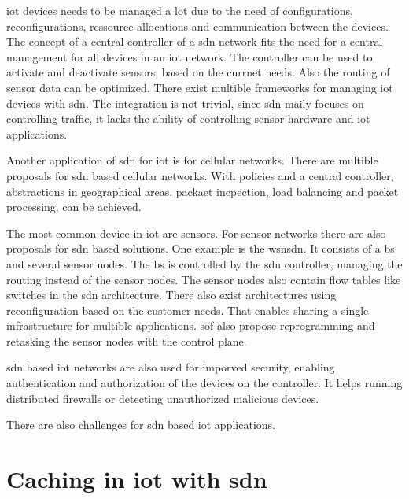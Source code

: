 \documentclass[conference]{IEEEtran}
\begin{document}
	\ac{iot} devices needs to be managed a lot due to the need of configurations, reconfigurations, ressource allocations and communication between the devices. \cite{10.1145/3102304.3102319} The concept of a central controller of a \ac{sdn} network fits the need for a central management for all devices in an \ac{iot} network. The controller can be used to activate and deactivate sensors, based on the currnet needs. Also the routing of sensor data can be optimized. \cite{Li2020-lx} There exist multible frameworks for managing \ac{iot} devices with \ac{sdn}. \cite{10.1145/3102304.3102319} The integration is not trivial, since \ac{sdn} maily focuses on controlling traffic, it lacks the ability of controlling sensor hardware and \ac{iot} applications. \cite{Li2020-lx}

	Another application of \ac{sdn} for \ac{iot} is for cellular networks. There are multible proposals for \ac{sdn} based cellular networks. With policies and a central controller, abstractions in geographical areas, packaet incpection, load balancing and packet processing, can be achieved. \cite{10.1145/3102304.3102319}

	The most common device in \ac{iot} are sensors. For sensor networks there are also proposals for \ac{sdn} based solutions. One example is the \ac{wsnsdn}. It consists of a \ac{bs} and several sensor nodes. The \ac{bs} is controlled by the \ac{sdn} controller, managing the routing instead of the sensor nodes. The sensor nodes also contain flow tables like switches in the \ac{sdn} architecture. \cite{Li2020-lx} There also exist architectures using reconfiguration based on the customer needs. That enables sharing a single infrastructure for multible applications. \ac{sof} also propose reprogramming and retasking the sensor nodes with the control plane. \cite{10.1145/3102304.3102319}

	\ac{sdn} based \ac{iot} networks are also used for imporved security, enabling authentication and authorization of the devices on the controller. It helps running distributed firewalls or detecting unauthorized malicious devices. \cite{10.1145/3102304.3102319}

	There are also challenges for \ac{sdn} based \ac{iot} applications.

	\cite{8777339} \cite{10.1145/3102304.3102319}

	\section{Caching in \ac{iot} with \ac{sdn}}
	\label{section:caching}
\end{document}
